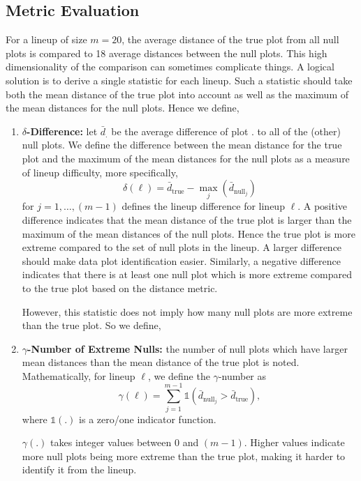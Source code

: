 \documentclass[12pt]{article}\usepackage[]{graphicx}\usepackage[]{color}
\begin{document}
\subsection{Metric Evaluation} \label{sec:eval}
%
For a lineup of size $m = 20$, the average distance of the true plot from all null plots is compared to 18 average distances between the null plots. This high dimensionality of the comparison can sometimes complicate things. A logical solution is to derive a single statistic for each lineup. Such a statistic should take both the mean distance of the true plot into account as well as the maximum of the mean distances for the null plots. Hence we define, 
\begin{enumerate}
\item {\bf $\delta$-Difference:} let $\bar{d}_.$ be the average difference of plot $.$ to all of the (other) null plots. We define the difference between the mean distance for the true plot and the maximum of the mean distances for the null plots as a measure of lineup difficulty, more specifically, 
\begin{equation}\label{eq:delta}
\delta(\ell) = \bar{d}_{\text{true}} - \max_j \left(\bar{d}_{\text{null}_j}\right)
\end{equation}
for $j = 1, \dots, (m  - 1)$ 
defines the lineup difference for lineup $\ell$.
 A positive difference  indicates that the mean distance of the true plot is larger than the maximum of the mean distances of the null plots. Hence the true plot is more extreme compared to the set of null plots in the lineup. A larger difference should make data plot identification easier. 
 Similarly, a negative difference indicates that there is at least one null plot which is more extreme compared to the true plot based on the distance metric.

However, this statistic does not imply how many null plots are more extreme than the true plot. So we define,
\item {\bf $\gamma$-Number of Extreme Nulls:}  the number of null plots which have larger mean distances than the mean distance of the true plot is noted. Mathematically, for lineup $\ell$, we define the $\gamma$-number as
\begin{equation}\label{eq:nullcount}
\gamma(\ell) = \sum_{j = 1}^{m - 1} \mathds{1}\left(\bar{d}_{\text{null}_j} > \bar{d}_{\text{true}}\right),
\end{equation}
where $\mathds{1}(.)$ is a zero/one indicator function.

$\gamma(.)$ takes integer values between 0 and $(m - 1)$. Higher values indicate more null plots being more extreme than the true plot, making it harder to identify it from the lineup.
\end{enumerate}
\end{document}
